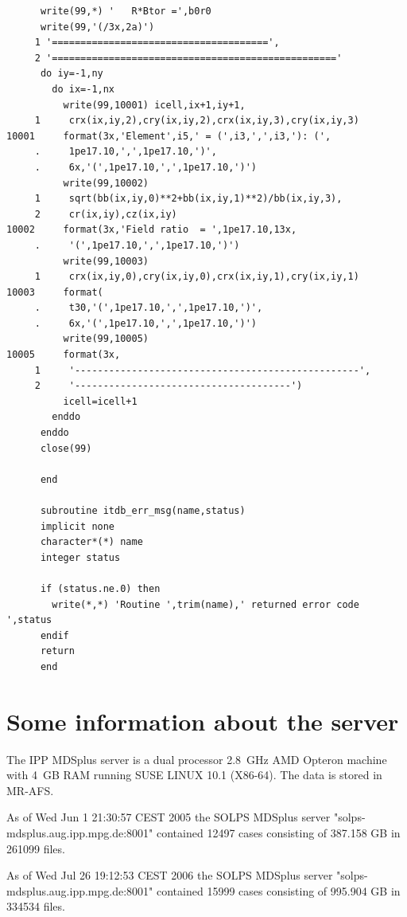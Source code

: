\documentclass[a4paper,10pt]{report}
\begin{document}
\begin{verbatim}
      write(99,*) '   R*Btor =',b0r0
      write(99,'(/3x,2a)')
     1 '======================================',
     2 '=================================================='
      do iy=-1,ny
        do ix=-1,nx
          write(99,10001) icell,ix+1,iy+1,
     1     crx(ix,iy,2),cry(ix,iy,2),crx(ix,iy,3),cry(ix,iy,3)
10001     format(3x,'Element',i5,' = (',i3,',',i3,'): (',
     .     1pe17.10,',',1pe17.10,')',
     .     6x,'(',1pe17.10,',',1pe17.10,')')
          write(99,10002)
     1     sqrt(bb(ix,iy,0)**2+bb(ix,iy,1)**2)/bb(ix,iy,3),
     2     cr(ix,iy),cz(ix,iy)
10002     format(3x,'Field ratio  = ',1pe17.10,13x,
     .     '(',1pe17.10,',',1pe17.10,')')
          write(99,10003)
     1     crx(ix,iy,0),cry(ix,iy,0),crx(ix,iy,1),cry(ix,iy,1)
10003     format(
     .     t30,'(',1pe17.10,',',1pe17.10,')',
     .     6x,'(',1pe17.10,',',1pe17.10,')')
          write(99,10005)
10005     format(3x,
     1     '--------------------------------------------------',
     2     '--------------------------------------')
          icell=icell+1
        enddo
      enddo
      close(99)

      end

      subroutine itdb_err_msg(name,status)
      implicit none
      character*(*) name
      integer status

      if (status.ne.0) then
        write(*,*) 'Routine ',trim(name),' returned error code ',status
      endif
      return
      end
\end{verbatim}


\section{Some information about the server}

The IPP MDSplus server is a dual processor 2.8~GHz AMD Opteron machine with 4~GB RAM
running SUSE LINUX 10.1 (X86-64).  The data is stored in MR-AFS.


As of Wed Jun 1 21:30:57 CEST 2005 the SOLPS MDSplus server
"solps-mdsplus.aug.ipp.mpg.de:8001" contained 12497 cases consisting of
387.158 GB in 261099 files.

As of Wed Jul 26 19:12:53 CEST 2006 the SOLPS MDSplus server
"solps-mdsplus.aug.ipp.mpg.de:8001" contained 15999 cases consisting of
995.904 GB in 334534 files.
\end{document}
